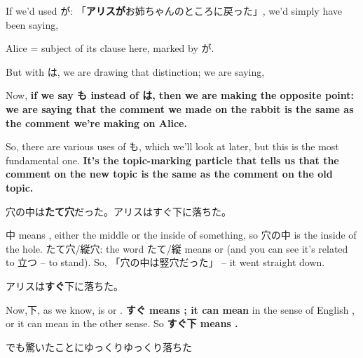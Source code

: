 \thinrule

If we'd used が: 「{\bf アリスが}お姉ちゃんのところに戻った」, we'd simply have been saying, 

Alice = subject of its clause here, marked by が.

But with は, we are drawing that distinction; we are saying, 

\thinrule

Now, {\bf if we say も instead of は, then we are making the opposite point: we are saying that the comment we made on the rabbit is the same as the comment we're making on Alice.}

{}


So, there are various uses of も, which we'll look at later, but this is the most fundamental one. {\bf It's the topic-marking particle that tells us that the comment on the new topic is the same as the comment on the old topic.}

\thinrule

穴の中は{\bf たて穴}だった。アリスはすぐ下に落ちた。

{}

中 means , either the middle or the inside of something, so 穴の中 is the inside of the hole. たて穴/縦穴: the word たて/縦 means  or  (and you can see it's related to 立つ -- to stand). So, 「穴の中は竪穴だった」 -- it went straight down.

\startblockquote
アリスは{\bf すぐ}下に落ちた。
\stopblockquote

{}

Now,下, as we know, is  or . {\bf すぐ means ; it can mean } in the sense of English , or it can mean  in the other sense. So {\bf すぐ下 means .}

\thinrule

\startblockquote
でも驚いたことにゆっくりゆっくり落ちた
\stopblockquote

